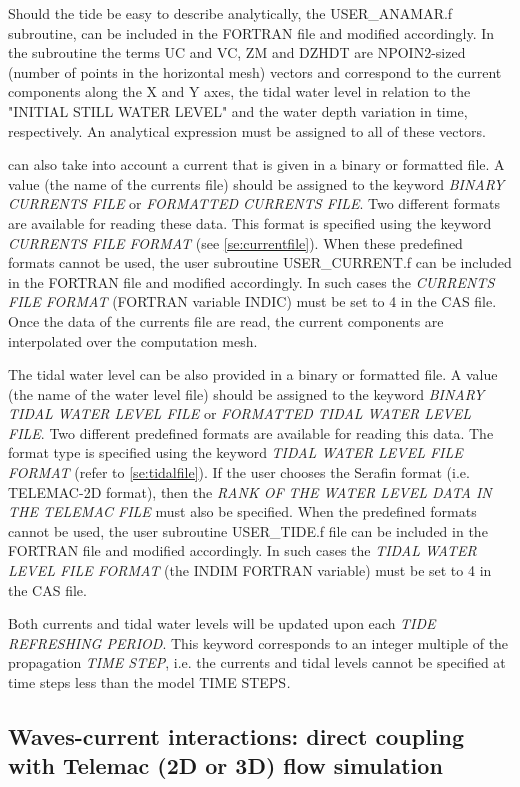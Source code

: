 Should the tide be easy to describe analytically, the USER\_ANAMAR.f subroutine, can be included in the FORTRAN file and modified
accordingly. In the subroutine the terms UC and VC, ZM and DZHDT are NPOIN2-sized (number of points in the horizontal mesh) vectors
and correspond to the current components along the X and Y axes, the tidal water level in relation to the "INITIAL STILL WATER LEVEL"
and the water depth variation in time, respectively. An analytical expression must be assigned to all of these vectors.

\tomawac can also take into account a current that is given in a binary or formatted file. A value (the name of the currents file)
should be assigned to the keyword \textit{BINARY CURRENTS FILE} or\textit{ FORMATTED CURRENTS FILE}. Two different formats are available
for reading these data. This format is specified using the keyword \textit{CURRENTS FILE FORMAT} (see \ref{se:currentfile}). When these
predefined formats cannot be used, the user subroutine USER\_CURRENT.f can be included in the FORTRAN file and modified accordingly. In
such cases the \textit{CURRENTS FILE FORMAT} (FORTRAN variable INDIC) must be set to 4 in the CAS file. Once the data of the currents
file are read, the current components are interpolated over the computation mesh.

The tidal water level can be also provided in a binary or formatted file. A value (the name of the water level file) should be
assigned to the keyword \textit{BINARY TIDAL WATER LEVEL FILE} or\textit{ FORMATTED TIDAL WATER LEVEL FILE}. Two different predefined
formats are available for reading this data. The format type is specified using the keyword \textit{TIDAL WATER LEVEL FILE FORMAT}
(refer to \ref{se:tidalfile}). If the user chooses the Serafin format (i.e. TELEMAC-2D format), then the \textit{RANK OF THE WATER
  LEVEL DATA IN THE TELEMAC FILE} must also be specified. When the predefined formats cannot be used, the user subroutine
USER\_TIDE.f file can be included in the FORTRAN file and modified accordingly. In such cases the \textit{TIDAL WATER LEVEL FILE FORMAT}
(the INDIM FORTRAN variable) must be set to 4 in the CAS file.

Both currents and tidal water levels will be updated upon each \textit{TIDE REFRESHING PERIOD}. This keyword corresponds to an integer
multiple of the propagation \textit{TIME STEP}, i.e. the currents and tidal levels cannot be specified at time steps less than the
model TIME STEPS\textit{.}


\subsection{ Waves-current interactions: direct coupling with Telemac (2D or 3D) flow simulation}

